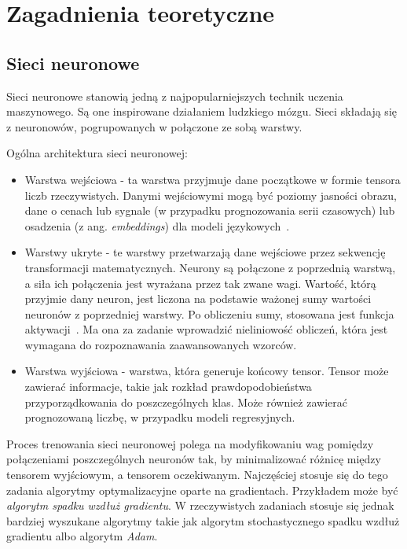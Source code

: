 \chapter{Zagadnienia teoretyczne}


\section{Sieci neuronowe}

Sieci neuronowe stanowią jedną z najpopularniejszych technik uczenia maszynowego.
Są one inspirowane działaniem ludzkiego mózgu.
Sieci składają się z neuronowów, pogrupowanych w połączone ze sobą warstwy.

Ogólna architektura sieci neuronowej:
\begin{itemize}
    \item Warstwa wejściowa - ta warstwa przyjmuje dane początkowe w formie tensora liczb rzeczywistych.
    Danymi wejściowymi mogą być poziomy jasności obrazu, dane o cenach lub sygnale (w przypadku prognozowania serii czasowych) lub osadzenia (z ang. \textit{embeddings}) dla modeli językowych~\cite{embeddings}.
    \item Warstwy ukryte - te warstwy przetwarzają dane wejściowe przez sekwencję transformacji matematycznych.
    Neurony są połączone z poprzednią warstwą, a siła ich połączenia jest wyrażana przez tak zwane wagi.
    Wartość, którą przyjmie dany neuron, jest liczona na podstawie ważonej sumy wartości neuronów z poprzedniej warstwy.
    Po obliczeniu sumy, stosowana jest funkcja aktywacji~\cite{activations}.
    Ma ona za zadanie wprowadzić nieliniowość obliczeń, która jest wymagana do rozpoznawania zaawansowanych wzorców.
    \item Warstwa wyjściowa - warstwa, która generuje końcowy tensor.
    Tensor może zawierać informacje, takie jak rozkład prawdopodobieństwa przyporządkowania do poszczególnych klas.
    Może również zawierać prognozowaną liczbę, w przypadku modeli regresyjnych.
\end{itemize}

Proces trenowania sieci neuronowej polega na modyfikowaniu wag pomiędzy połączeniami poszczególnych neuronów tak, by minimalizować różnicę między tensorem wyjściowym, a tensorem oczekiwanym.
Najczęściej stosuje się do tego zadania algorytmy optymalizacyjne oparte na gradientach.
Przykładem może być \textit{algorytm spadku wzdłuż gradientu}.
W rzeczywistych zadaniach stosuje się jednak bardziej wyszukane algorytmy takie jak algorytm stochastycznego spadku wzdłuż gradientu albo algorytm \textit{Adam}.


